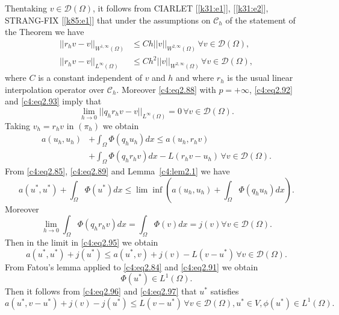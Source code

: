 Then\pageoriginale  taking $v \in \mathscr{D}(\Omega)$, it follows
from CIARLET [\ref{k31:e1}], [\ref{k31:e2}], STRA\-NG-FIX [\ref{k85:e1}]
that under the assumptions on 
$\mathscr{C}_h$ of the statement of the Theorem we have  
\begin{align}
||r_h v-v||_{W^{1, \infty}(\Omega)} & \leq Ch ||v||_{W^{2, \infty}(\Omega)}\, \forall v \in \mathscr{D}(\Omega), \tag{2.92}\label{c4:eq2.92}\\
||r_h v-v||_{L^{\infty}(\Omega)} & \leq Ch^2 ||v||_{W^{2, \infty}(\Omega)}\, \forall v \in \mathscr{D}(\Omega), \tag{2.93}\label{c4:eq2.93}
\end{align}
where $C$ is a constant independent of $v$ and $h$ and where $r_h$ is the usual linear interpolation operator over $\mathscr{C}_h$. Moreover \eqref{c4:eq2.88} with $p = + \infty$, \eqref{c4:eq2.92} and \eqref{c4:eq2.93} imply that 
\begin{equation}
\lim_{h \to 0} ||q_h r_h v - v||_{L^{\infty}(\Omega)} = 0\, \forall v \in 
\mathscr{D}(\Omega). \tag{2.94}\label{c4:eq2.94}
\end{equation}
Taking $v_h = r_h v$ in $(\pi_h)$ we obtain 
\begin{align*}
a(u_h, u_h) & + \int_\Omega \Phi (q_h u_h) dx \leq a(u_h, r_h v)\\ 
& +\int_\Omega \Phi  
(q_h r_h v) dx - L(r_h v-u_h)\, \forall v \in \mathscr{D}
(\Omega). \tag{2.95}\label{c4:eq2.95} 
\end{align*}
From \eqref{c4:eq2.85}, \eqref{c4:eq2.89} and Lemma~\ref{c4:lem2.1} we have
$$
a(u^*, u^*) + \int_\Omega \Phi (u^*) dx \leq\lim \inf (a(u_h, u_h) 
+ \int_\Omega \Phi (q_h u_h)dx).
$$
Moreover 
$$
\lim_{h \to 0} \int_\Omega \Phi(q_h r_h v)dx = \int_\Omega \Phi(v)dx = j(v) 
\forall v \in \mathscr{D} (\Omega).
$$
Then in the limit in \eqref{c4:eq2.95} we obtain
\begin{equation}
a(u^*, u^*) + j(u^*) \leq a(u^*, v) +j(v)-L(v-u^*)\, \forall v \in 
\mathscr{D}(\Omega). \tag{2.96}\label{c4:eq2.96}
\end{equation}
From Fatou's lemma applied to \eqref{c4:eq2.84} and \eqref{c4:eq2.91} we obtain 
\begin{equation}
\Phi (u^*) \in L^1(\Omega). \tag{2.97}\label{c4:eq2.97}
\end{equation}
Then it follows from \eqref{c4:eq2.96} and \eqref{c4:eq2.97} that $u^*$ satisfies 
\begin{equation}
a(u^*, v - u^*) + j(v) - j(u^*) \leq L(v-u^*)\, \forall v \in 
\mathscr{D}(\Omega), u^* \in V, \phi (u^*) \in L^1(\Omega). \tag{2.98}\label{c4:eq2.98}
\end{equation}

